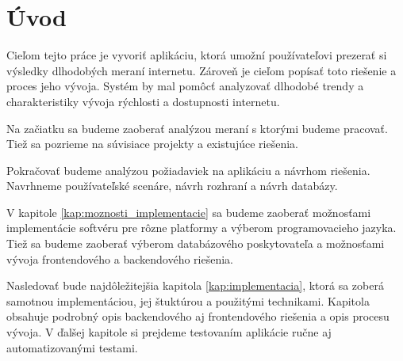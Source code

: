 \chapter*{Úvod} %

Cieľom tejto práce je vyvoriť aplikáciu, ktorá umožní používateľovi prezerať si výsledky dlhodobých meraní internetu.
Zároveň je cieľom popísať toto riešenie a proces jeho vývoja. Systém by mal pomôcť analyzovať dlhodobé trendy a charakteristiky 
vývoja rýchlosti a dostupnosti internetu.

Na začiatku sa budeme zaoberať analýzou meraní s ktorými budeme pracovať. Tiež sa pozrieme na súvisiace projekty
a existujúce riešenia. 

Pokračovať budeme analýzou požiadaviek na aplikáciu a návrhom riešenia. Navrhneme používateľské scenáre, návrh rozhraní 
a návrh databázy.

V kapitole \ref{kap:moznosti_implementacie} sa budeme zaoberať možnosťami implementácie softvéru pre rôzne platformy a výberom programovacieho jazyka. 
Tiež sa budeme zaoberať výberom databázového poskytovateľa a možnosťami vývoja frontendového a backendového riešenia.

Nasledovať bude najdôležitejšia kapitola \ref{kap:implementacia}, ktorá sa zoberá samotnou implementáciou, jej štuktúrou a použitými technikami.
Kapitola obsahuje podrobný opis backendového aj frontendového riešenia a opis procesu vývoja. V ďalšej kapitole si prejdeme testovaním aplikácie 
ručne aj automatizovanými testami.
 

